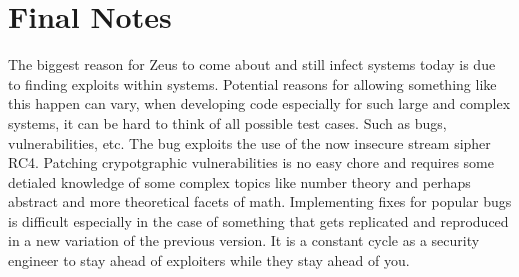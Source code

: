 \documentclass[12pt, letterpaper]{article}
\begin{document}
\begin{sloppypar}
\section*{Final Notes}
The biggest reason for Zeus to come about and still infect systems today
is due to finding exploits within systems. Potential reasons for
allowing something like this happen can vary, when developing code
especially for such large and complex systems, it can be hard to think
of all possible test cases. Such as bugs, vulnerabilities, etc. The bug
exploits the use of the now insecure stream sipher RC4. Patching
crypotgraphic vulnerabilities is no easy chore and requires some
detialed knowledge of some complex topics like number theory and perhaps
abstract and more theoretical facets of math. Implementing fixes for
popular bugs is difficult especially in the case of something that gets
replicated and reproduced in a new variation of the previous version. It
is a constant cycle as a security engineer to stay ahead of exploiters
while they stay ahead of you.

\end{sloppypar}
\end{document}
